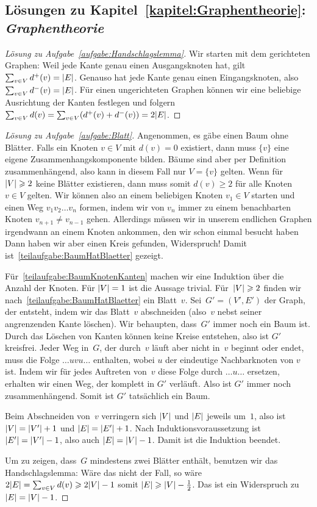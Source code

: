 
\subsection*{Lösungen zu Kapitel~\ref{kapitel:Graphentheorie}: \emph{Graphentheorie}}
\begin{proof}[Lösung zu Aufgabe~\ref{aufgabe:Handschlagslemma}]
	Wir starten mit dem gerichteten Graphen: Weil jede Kante genau einen Ausgangsknoten hat, gilt $\sum_{v\in V}d^+(v)=\abs{E}$. Genauso hat jede Kante genau einen Eingangsknoten, also $\sum_{v\in V}d^-(v)=\abs{E}$. Für einen ungerichteten Graphen können wir eine beliebige Ausrichtung der Kanten festlegen und folgern $\sum_{v\in V}d(v)=\sum_{v\in V}\parens*{d^+(v)+d^-(v)}=2\abs{E}$.
\end{proof}
\begin{proof}[Lösung zu Aufgabe~\ref{aufgabe:Blatt}]
	Angenommen, es gäbe einen Baum ohne Blätter. Falls ein Knoten $v\in V$ mit $d(v)=0$ existiert, dann muss $\{v\}$ eine eigene Zusammenhangskomponente bilden. Bäume sind aber per Definition zusammenhängend, also kann in diesem Fall nur $V=\{v\}$ gelten. Wenn für $\abs*{V}\geqslant 2$ keine Blätter existieren, dann muss somit $d(v)\geqslant 2$ für alle Knoten $v\in V$ gelten. Wir können also an einem beliebigen Knoten $v_1\in V$ starten und einen Weg $v_1v_2\dots v_n$ formen, indem wir von $v_n$ immer zu einem benachbarten Knoten $v_{n+1}\neq v_{n-1}$ gehen. Allerdings müssen wir in unserem endlichen Graphen irgendwann an einem Knoten ankommen, den wir schon einmal besucht haben Dann haben wir aber einen Kreis gefunden, Widerspruch! Damit ist~\ref{teilaufgabe:BaumHatBlaetter} gezeigt.
	
	Für~\ref{teilaufgabe:BaumKnotenKanten} machen wir eine Induktion über die Anzahl der Knoten. Für $\abs*{V}=1$ ist die Aussage trivial. Für~$\abs*{V}\geqslant 2$ finden wir nach~\ref{teilaufgabe:BaumHatBlaetter} ein Blatt~$v$. Sei~$G'=(V',E')$ der Graph, der entsteht, indem wir das Blatt~$v$ abschneiden (also~$v$ nebst seiner angrenzenden Kante löschen). Wir behaupten, dass~$G'$ immer noch ein Baum ist. Durch das Löschen von Kanten können keine Kreise entstehen, also ist $G'$ kreisfrei. Jeder Weg in~$G$, der durch~$v$ läuft aber nicht in~$v$ beginnt oder endet, muss die Folge $\ldots uvu\ldots$ enthalten, wobei $u$ der eindeutige Nachbarknoten von $v$ ist. Indem wir für jedes Auftreten von~$v$ diese Folge durch $\ldots u\ldots $ ersetzen, erhalten wir einen Weg, der komplett in $G'$ verläuft. Also ist $G'$ immer noch zusammenhängend. Somit ist $G'$ tatsächlich ein Baum.
	
	Beim Abschneiden von~$v$ verringern sich $\abs*{V}$ und $\abs{E}$ jeweils um~$1$, also ist $\abs*{V}=\abs{V'}+1$ und $\abs*{E}=\abs{E'}+1$. Nach Induktionsvoraussetzung ist $\abs{E'}=\abs{V'}-1$, also auch $\abs*{E}=\abs{V}-1$. Damit ist die Induktion beendet.
	
	Um zu zeigen, dass~$G$ mindestens zwei Blätter enthält, benutzen wir das Handschlagslemma: Wäre das nicht der Fall, so wäre $2\abs*{E}=\sum_{v\in V}d(v)\geqslant 2\abs*{V}-1$ somit $\abs*{E}\geqslant \abs*{V}-\frac12$. Das ist ein Widerspruch zu $\abs*{E}=\abs*{V}-1$.
\end{proof}
